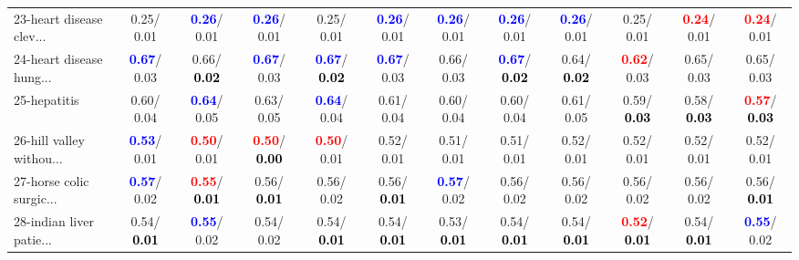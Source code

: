\begin{table}[h]
\begin{center}
{\begin{tabular}{lc|c|c|c|c|c|c|c|c|c|c}
23-heart disease clev... &   0.25/  0.01 & \textcolor{blue}{\textbf{  0.26}}/  0.01 & \textcolor{blue}{\textbf{  0.26}}/  0.01 &   0.25/  0.01 & \textcolor{blue}{\textbf{  0.26}}/  0.01 & \textcolor{blue}{\textbf{  0.26}}/  0.01 & \textcolor{blue}{\textbf{  0.26}}/  0.01 & \textcolor{blue}{\textbf{  0.26}}/  0.01 &   0.25/  0.01 & \textcolor{red}{\textbf{  0.24}}/  0.01 & \textcolor{red}{\textbf{  0.24}}/  0.01 \\
24-heart disease hung... & \textcolor{blue}{\textbf{  0.67}}/  0.03 &   0.66/\textcolor{black}{\textbf{  0.02}} & \textcolor{blue}{\textbf{  0.67}}/  0.03 & \textcolor{blue}{\textbf{  0.67}}/\textcolor{black}{\textbf{  0.02}} & \textcolor{blue}{\textbf{  0.67}}/  0.03 &   0.66/  0.03 & \textcolor{blue}{\textbf{  0.67}}/\textcolor{black}{\textbf{  0.02}} &   0.64/\textcolor{black}{\textbf{  0.02}} & \textcolor{red}{\textbf{  0.62}}/  0.03 &   0.65/  0.03 &   0.65/  0.03 \\
25-hepatitis &   0.60/  0.04 & \textcolor{blue}{\textbf{  0.64}}/  0.05 &   0.63/  0.05 & \textcolor{blue}{\textbf{  0.64}}/  0.04 &   0.61/  0.04 &   0.60/  0.04 &   0.60/  0.04 &   0.61/  0.05 &   0.59/\textcolor{black}{\textbf{  0.03}} &   0.58/\textcolor{black}{\textbf{  0.03}} & \textcolor{red}{\textbf{  0.57}}/\textcolor{black}{\textbf{  0.03}} \\
26-hill valley withou... & \textcolor{blue}{\textbf{  0.53}}/  0.01 & \textcolor{red}{\textbf{  0.50}}/  0.01 & \textcolor{red}{\textbf{  0.50}}/\textcolor{black}{\textbf{  0.00}} & \textcolor{red}{\textbf{  0.50}}/  0.01 &   0.52/  0.01 &   0.51/  0.01 &   0.51/  0.01 &   0.52/  0.01 &   0.52/  0.01 &   0.52/  0.01 &   0.52/  0.01 \\
27-horse colic surgic... & \textcolor{blue}{\textbf{  0.57}}/  0.02 & \textcolor{red}{\textbf{  0.55}}/\textcolor{black}{\textbf{  0.01}} &   0.56/\textcolor{black}{\textbf{  0.01}} &   0.56/  0.02 &   0.56/\textcolor{black}{\textbf{  0.01}} & \textcolor{blue}{\textbf{  0.57}}/  0.02 &   0.56/  0.02 &   0.56/  0.02 &   0.56/  0.02 &   0.56/  0.02 &   0.56/\textcolor{black}{\textbf{  0.01}} \\
28-indian liver patie... &   0.54/\textcolor{black}{\textbf{  0.01}} & \textcolor{blue}{\textbf{  0.55}}/  0.02 &   0.54/  0.02 &   0.54/\textcolor{black}{\textbf{  0.01}} &   0.54/\textcolor{black}{\textbf{  0.01}} &   0.53/\textcolor{black}{\textbf{  0.01}} &   0.54/\textcolor{black}{\textbf{  0.01}} &   0.54/\textcolor{black}{\textbf{  0.01}} & \textcolor{red}{\textbf{  0.52}}/\textcolor{black}{\textbf{  0.01}} &   0.54/\textcolor{black}{\textbf{  0.01}} & \textcolor{blue}{\textbf{  0.55}}/  0.02 \\ \hline

\end{tabular}}
\end{center}
\end{table}
